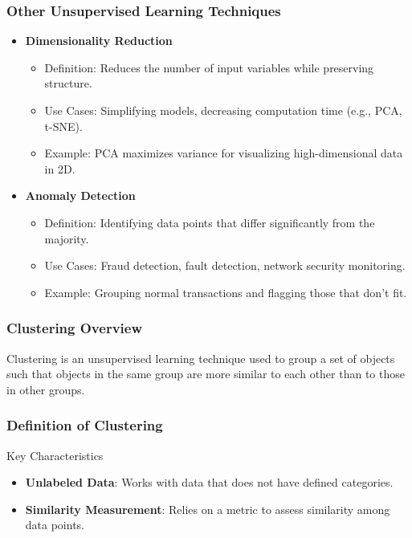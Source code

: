 \documentclass[aspectratio=169]{beamer}
\begin{document}
\begin{frame}[fragile]
    \frametitle{Other Unsupervised Learning Techniques}
    \begin{itemize}
        \item \textbf{Dimensionality Reduction}
          \begin{itemize}
              \item Definition: Reduces the number of input variables while preserving structure.
              \item Use Cases: Simplifying models, decreasing computation time (e.g., PCA, t-SNE).
              \item Example: PCA maximizes variance for visualizing high-dimensional data in 2D.
          \end{itemize}
        \item \textbf{Anomaly Detection}
          \begin{itemize}
              \item Definition: Identifying data points that differ significantly from the majority.
              \item Use Cases: Fraud detection, fault detection, network security monitoring.
              \item Example: Grouping normal transactions and flagging those that don't fit.
          \end{itemize}
    \end{itemize}
\end{frame}

\begin{frame}[fragile]
    \frametitle{Clustering Overview}
    Clustering is an unsupervised learning technique used to group a set of objects such that objects in the same group are more similar to each other than to those in other groups. 
\end{frame}

\begin{frame}[fragile]
    \frametitle{Definition of Clustering}
    \begin{block}{Key Characteristics}
        \begin{itemize}
            \item \textbf{Unlabeled Data}: Works with data that does not have defined categories.
            \item \textbf{Similarity Measurement}: Relies on a metric to assess similarity among data points.
        \end{itemize}
    \end{block}
\end{frame}
\end{document}
